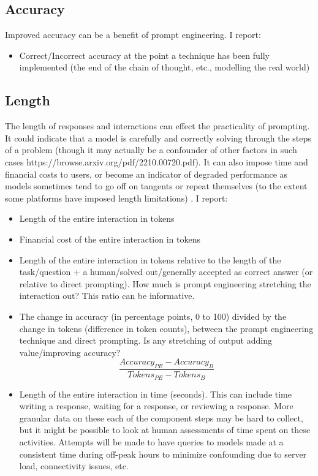 \documentclass[11pt]{article}
\begin{document}
\subsection*{Accuracy}

Improved accuracy can be a benefit of prompt engineering. I report:

\begin{itemize}
  \item Correct/Incorrect accuracy at the point a technique has been fully implemented (the end of the chain of thought, etc., modelling the real world)
\end{itemize}

\subsection*{Length}

The length of responses and interactions can effect the practicality of prompting. It could indicate that a model is carefully and correctly solving through the steps of a problem (though it may actually be a confounder of other factors in such cases https://browse.arxiv.org/pdf/2210.00720.pdf). It can also impose time and financial costs to users, or become an indicator of degraded performance as models sometimes tend to go off on tangents or repeat themselves (to the extent some platforms have imposed length limitations) \cite{mann_microsoft_nodate}. I report:

\begin{itemize}
  \item Length of the entire interaction in tokens
  \item Financial cost of the entire interaction in tokens
  \item Length of the entire interaction in tokens relative to the length of the task/question + a human/solved out/generally accepted as correct answer (or relative to direct prompting). How much is prompt engineering stretching the interaction out? This ratio can be informative.
  \item The change in accuracy (in percentage points, 0 to 100) divided by the change in tokens (difference in token counts), between the prompt engineering technique and direct prompting. Is any stretching of output adding value/improving accuracy? %
  \begin{displaymath}
    \frac{Accuracy_{PE} - Accuracy_{B}}{Tokens_{PE} - Tokens_{B}}
  \end{displaymath}
  \item Length of the entire interaction in time (seconds). This can include time writing a response, waiting for a response, or reviewing a response. More granular data on these each of the component steps may be hard to collect, but it might be possible to look at human assessments of time spent on these activities. Attempts will be made to have queries to models made at a consistent time during off-peak hours to minimize confounding due to server load, connectivity issues, etc.
\end{itemize}
\end{document}
